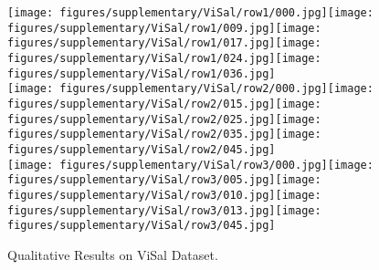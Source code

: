\documentclass{bmvc2k}
\begin{document}
 \begin{figure}[h]
\centering
\texttt{[image: figures/supplementary/ViSal/row1/000.jpg]}\hspace{1px}\texttt{[image: figures/supplementary/ViSal/row1/009.jpg]}\hspace{1px}\texttt{[image: figures/supplementary/ViSal/row1/017.jpg]}\hspace{1px}\texttt{[image: figures/supplementary/ViSal/row1/024.jpg]}\hspace{1px}\texttt{[image: figures/supplementary/ViSal/row1/036.jpg]}\\
\texttt{[image: figures/supplementary/ViSal/row2/000.jpg]}\hspace{1px}\texttt{[image: figures/supplementary/ViSal/row2/015.jpg]}\hspace{1px}\texttt{[image: figures/supplementary/ViSal/row2/025.jpg]}\hspace{1px}\texttt{[image: figures/supplementary/ViSal/row2/035.jpg]}\hspace{1px}\texttt{[image: figures/supplementary/ViSal/row2/045.jpg]}\\
\texttt{[image: figures/supplementary/ViSal/row3/000.jpg]}\hspace{1px}\texttt{[image: figures/supplementary/ViSal/row3/005.jpg]}\hspace{1px}\texttt{[image: figures/supplementary/ViSal/row3/010.jpg]}\hspace{1px}\texttt{[image: figures/supplementary/ViSal/row3/013.jpg]}\hspace{1px}\texttt{[image: figures/supplementary/ViSal/row3/045.jpg]}\\
  
\vspace{-2px}
  \caption{Qualitative Results on ViSal Dataset.}
  \label{fig:teaser}
\end{figure} 
\end{document}
